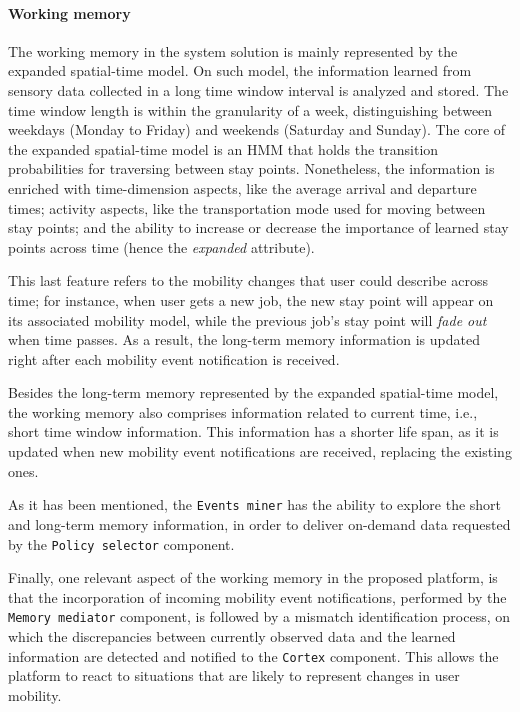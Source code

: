 \documentclass[ENG,PhD]{cinvestav}
\begin{document}
\paragraph*{Working memory}
The working memory in the system solution is mainly represented by the expanded spatial-time model.
On such model, the information learned from sensory data collected in a long time window interval is analyzed and stored.
The time window length is within the granularity of a week, distinguishing between weekdays (Monday to Friday) and weekends (Saturday and Sunday).
The core of the expanded spatial-time model is an HMM that holds the transition probabilities for traversing between stay points.
Nonetheless, the information is enriched with time-dimension aspects, like the average arrival and departure times; activity aspects, like the transportation mode used for moving between stay points; and the ability to increase or decrease the importance of learned stay points across time (hence the \emph{expanded} attribute). 

This last feature refers to the mobility changes that user could describe across time; for instance, when user gets a new job, the new stay point will appear on its associated mobility model, while the previous job's stay point will \emph{fade out} when time passes.
As a result, the long-term memory information is updated right after each mobility event notification is received.

Besides the long-term memory represented by the expanded spatial-time model, the working memory also comprises information related to current time, i.e., short time window information.
This information has a shorter life span, as it is updated when new mobility event notifications are received, replacing the existing ones. 

As it has been mentioned, the \texttt{Events miner} has the ability to explore the short and long-term memory information, in order to deliver on-demand data requested by the \texttt{Policy selector} component.

Finally, one relevant aspect of the working memory in the proposed platform, is that the incorporation of incoming mobility event notifications, performed by the \texttt{Memory mediator} component, is followed by a mismatch identification process, on which the discrepancies between currently observed data and the learned information are detected and notified to the \texttt{Cortex} component.
This allows the platform to react to situations that are likely to represent changes in user mobility.
\end{document}

